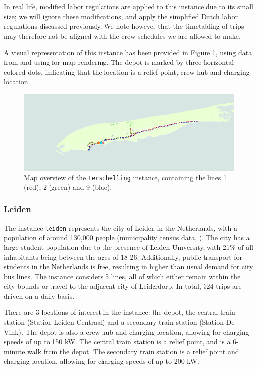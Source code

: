 \documentclass[]{article}
\begin{document}
In real life, modified labor regulations are applied to this instance due to its small size; we will ignore these modifications, and apply the simplified Dutch labor regulations discussed previously. We note however that the timetabling of trips may therefore not be aligned with the crew schedules we are allowed to make.

A visual representation of this instance has been provided in Figure \ref{fig:terschelling-map}, using data from \citet{OpenStreetMap2025} and using \citet{QGIS2025} for map rendering. The depot is marked by three horizontal colored dots, indicating that the location is a relief point, crew hub and charging location. 

\begin{figure}[h]
  \centering
  \includegraphics[width=\textwidth]{images/terschelling-instance.png}
  \caption{Map overview of the \texttt{terschelling} instance, containing the lines 1 (red), 2 (green) and 9 (blue).}
  \label{fig:terschelling-map}
\end{figure}

\subsubsection{Leiden}
The instance \texttt{leiden} represents the city of Leiden in the Netherlands, with a population of around 130,000 people (municipality census data, \citet{Leiden2025}). The city has a large student population due to the presence of Leiden University, with 21\% of all inhabitants being between the ages of 18-26. Additionally, public transport for students in the Netherlands is free, resulting in higher than usual demand for city bus lines. The instance considers 5 lines, all of which either remain within the city bounds or travel to the adjacent city of Leiderdorp. In total, 324 trips are driven on a daily basis. 

There are 3 locations of interest in the instance: the depot, the central train station (Station Leiden Centraal) and a secondary train station (Station De Vink). The depot is also a crew hub and charging location, allowing for charging speeds of up to 150 kW. The central train station is a relief point, and is a 6-minute walk from the depot. The secondary train station is a relief point and charging location, allowing for charging speeds of up to 200 kW.
\end{document}
